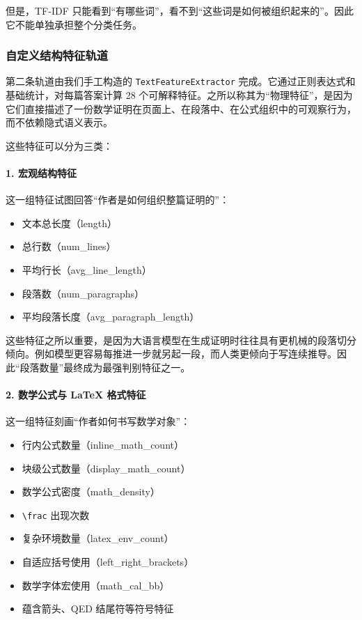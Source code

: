 \documentclass[11pt, a4paper]{ctexart}
\begin{document}
但是，TF-IDF 只能看到“有哪些词”，看不到“这些词是如何被组织起来的”。因此它不能单独承担整个分类任务。

\subsubsection{自定义结构特征轨道}
第二条轨道由我们手工构造的 \texttt{TextFeatureExtractor} 完成。它通过正则表达式和基础统计，对每篇答案计算 28 个可解释特征。之所以称其为“物理特征”，是因为它们直接描述了一份数学证明在页面上、在段落中、在公式组织中的可观察行为，而不依赖隐式语义表示。

这些特征可以分为三类：

\paragraph{1. 宏观结构特征}
这一组特征试图回答“作者是如何组织整篇证明的”：
\begin{itemize}
    \item 文本总长度（length）
    \item 总行数（num\_lines）
    \item 平均行长（avg\_line\_length）
    \item 段落数（num\_paragraphs）
    \item 平均段落长度（avg\_paragraph\_length）
\end{itemize}

这些特征之所以重要，是因为大语言模型在生成证明时往往具有更机械的段落切分倾向。例如模型更容易每推进一步就另起一段，而人类更倾向于写连续推导。因此“段落数量”最终成为最强判别特征之一。

\paragraph{2. 数学公式与 LaTeX 格式特征}
这一组特征刻画“作者如何书写数学对象”：
\begin{itemize}
    \item 行内公式数量（inline\_math\_count）
    \item 块级公式数量（display\_math\_count）
    \item 数学公式密度（math\_density）
    \item \texttt{\textbackslash frac} 出现次数
    \item 复杂环境数量（latex\_env\_count）
    \item 自适应括号使用（left\_right\_brackets）
    \item 数学字体宏使用（math\_cal\_bb）
    \item 蕴含箭头、QED 结尾符等符号特征
\end{itemize}
\end{document}
